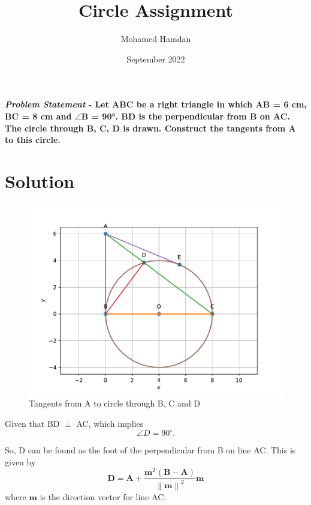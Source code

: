 \documentclass[journal,10pt,twocolumn]{article}
\title{\textbf{Circle Assignment}}
\author{Mohamed Hamdan}
\date{September 2022}
\providecommand{\norm}[1]{\left\lVert#1\right\rVert}
\let\vec\mathbf
\begin{document}
\maketitle
\paragraph{\textit{Problem Statement} - Let ABC be a right triangle in which AB = 6 cm, BC = 8 cm and $\angle$B = 90°. BD is the perpendicular from B on AC. The circle through B, C, D is drawn. Construct the tangents from A to this circle.}

\section*{\large Solution}

\begin{figure}[H]
\centering
\includegraphics[width=1\columnwidth]{figs/fig1.pdf}
\caption{Tangents from A to circle through B, C and D}
\label{fig:triangle}
\end{figure}

Given that BD $\perp$ AC, which implies
\begin{equation}
\angle D = 90^\circ. 
\label{eq1}
\end{equation}

So, D can be found as the foot of the perpendicular from B on line AC. This is given by
\begin{equation}
\vec{D} = \vec{A} + \frac{\vec{m}^T(\vec{B-A})}{\norm{\vec{m}}^2}\vec{m} 
\label{eq2}
\end{equation}
where $\vec{m}$ is the direction vector for line AC.
\end{document}
